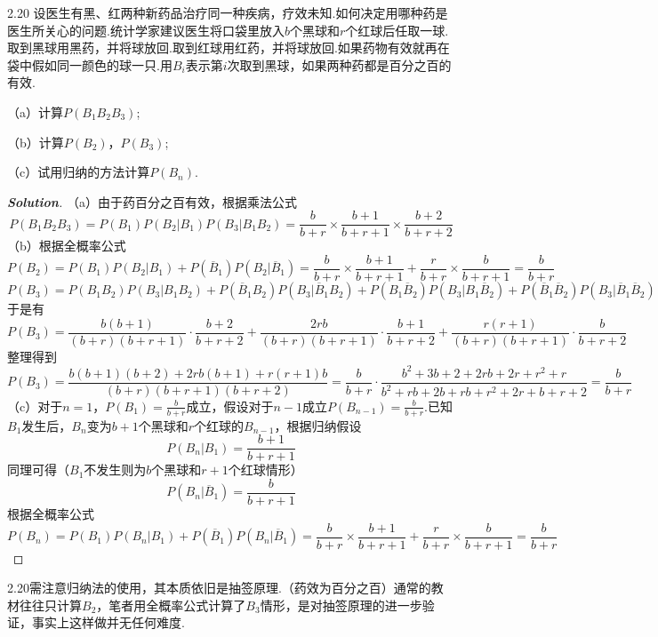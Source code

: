 \documentclass[10pt, a4paper, oneside]{ctexart}
\newenvironment{solution}{\begin{proof}[\bf Solution]}{\end{proof}}
\begin{document}
2.20 设医生有黑、红两种新药品治疗同一种疾病，疗效未知.如何决定用哪种药是医生所关心的问题.统计学家建议医生将口袋里放入$b$个黑球和$r$个红球后任取一球.取到黑球用黑药，并将球放回.取到红球用红药，并将球放回.如果药物有效就再在袋中假如同一颜色的球一只.用$B_i$表示第$i$次取到黑球，如果两种药都是百分之百的有效.

（a）计算$P(B_1B_2B_3)$;

（b）计算$P(B_2)$，$P(B_3)$;

（c）试用归纳的方法计算$P(B_n)$.
\begin{solution}
（a）由于药百分之百有效，根据乘法公式
\[P({B_1}{B_2}{B_3}) = P({B_1})P({B_2}|{B_1})P({B_3}|{B_1}{B_2}) = \frac{b}{{b + r}} \times \frac{{b + 1}}{{b + r + 1}} \times \frac{{b + 2}}{{b + r + 2}}\]
（b）根据全概率公式
\[P({B_2}) = P({B_1})P({B_2}|{B_1}) + P({\overline B _1})P({B_2}|{\overline B _1}) = \frac{b}{{b + r}} \times \frac{{b + 1}}{{b + r + 1}} + \frac{r}{{b + r}} \times \frac{b}{{b + r + 1}} = \frac{b}{{b + r}}\]
\[P({B_3}) = P({B_1}{B_2})P({B_3}|{B_1}{B_2}) + P({\overline B _1}{B_2})P({B_3}|{\overline B _1}{B_2}) + P({B_1}{\overline B _2})P({B_3}|{B_1}{\overline B _2}) + P({\overline B _1}{\overline B _2})P({B_3}|{\overline B _1}{\overline B _2})\]
于是有
\[P({B_3}) = \frac{{b(b + 1)}}{{(b + r)(b + r + 1)}} \cdot \frac{{b + 2}}{{b + r + 2}} + \frac{{2rb}}{{(b + r)(b + r + 1)}} \cdot \frac{{b + 1}}{{b + r + 2}} + \frac{{r(r + 1)}}{{(b + r)(b + r + 1)}} \cdot \frac{b}{{b + r + 2}}\]
整理得到
\[P({B_3}) = \frac{{b(b + 1)(b + 2) + 2rb(b + 1) + r(r + 1)b}}{{(b + r)(b + r + 1)(b + r + 2)}} = \frac{b}{{b + r}} \cdot \frac{{{b^2} + 3b + 2 + 2rb + 2r + {r^2} + r}}{{{b^2} + rb + 2b + rb + {r^2} + 2r + b + r + 2}} = \frac{b}{{b + r}}\]
（c）对于$n=1$，$P(B_1)=\frac{b}{b+r}$成立，假设对于$n-1$成立$P(B_{n-1})=\frac{b}{b+r}$.已知$B_1$发生后，$B_n$变为$b+1$个黑球和$r$个红球的$B_{n-1}$，根据归纳假设
\[P({B_n}|{B_1}) = \frac{{b + 1}}{{b + r + 1}}\]
同理可得（$B_1$不发生则为$b$个黑球和$r+1$个红球情形）
\[P({B_n}|{\overline B _1}) = \frac{b}{{b + r + 1}}\]
根据全概率公式
\[P({B_n}) = P({B_1})P({B_n}|{B_1}) + P({\overline B _1})P({B_n}|{\overline B _1}) = \frac{b}{{b + r}} \times \frac{{b + 1}}{{b + r + 1}} + \frac{r}{{b + r}} \times \frac{b}{{b + r + 1}} = \frac{b}{{b + r}}\]
\end{solution}
\begin{remark}
2.20需注意归纳法的使用，其本质依旧是抽签原理.（药效为百分之百）通常的教材往往只计算$B_2$，笔者用全概率公式计算了$B_3$情形，是对抽签原理的进一步验证，事实上这样做并无任何难度.
\end{remark}
\end{document}
